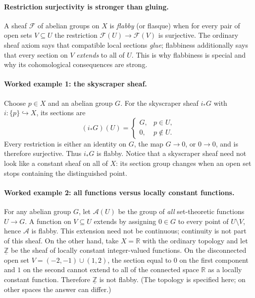 \paragraph{Restriction surjectivity is stronger than gluing.}
A sheaf $\mathcal F$ of abelian groups on $X$ is \emph{flabby}
(or flasque) when for every pair of open sets $V\subseteq U$
the restriction $\mathcal F(U)\to\mathcal F(V)$ is surjective.
The ordinary sheaf axiom says that compatible local sections
\emph{glue}; flabbiness additionally says that every section on
$V$ \emph{extends} to all of $U$.  This is why flabbiness is
special and why its cohomological consequences are strong.

\paragraph{Worked example 1: the skyscraper sheaf.}
Choose $p\in X$ and an abelian group $G$.  For the skyscraper
sheaf $i_*G$ with $i:\{p\}\hookrightarrow X$, its sections are
\[
 (i_*G)(U)=
 \begin{cases}G,&p\in U,\\0,&p\notin U.\end{cases}
\]
Every restriction is either an identity on $G$, the map
$G\to0$, or $0\to0$, and is therefore surjective.  Thus
$i_*G$ is flabby.  Notice that a skyscraper sheaf need not
look like a constant sheaf on all of $X$: its section group
changes when an open set stops containing the distinguished point.

\paragraph{Worked example 2: all functions versus locally constant functions.}
For any abelian group $G$, let $\mathcal A(U)$ be the group of
\emph{all} set-theoretic functions $U\to G$.  A function on
$V\subseteq U$ extends by assigning $0\in G$ to every point
of $U\setminus V$, hence $\mathcal A$ is flabby.  This extension
need not be continuous; continuity is not part of this sheaf.
On the other hand, take $X=\mathbb R$ with the ordinary topology
and let $\underline{\mathbb Z}$ be the sheaf of locally constant
integer-valued functions.  On the disconnected open set
$V=(-2,-1)\cup(1,2)$, the section equal to $0$ on the first
component and $1$ on the second cannot extend to all of the
connected space $\mathbb R$ as a locally constant function.
Therefore $\underline{\mathbb Z}$ is not flabby.  (The topology
is specified here; on other spaces the answer can differ.)

